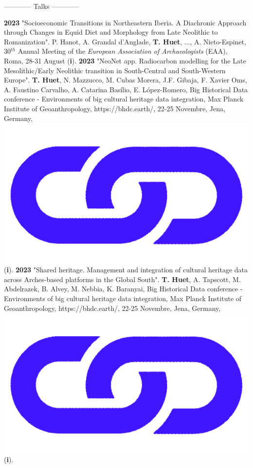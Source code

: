 \documentclass{article}
\newcommand{\fr}[1]{} %
\newcommand{\en}[1]{#1}   %
\begin{document}
\begin{center}
\fr{------------ Communications ------------}
\en{------------ Talks ------------}
\end{center} 
\smallbreak
\textbf{2023 }"Socioeconomic Transitions in Northeastern Iberia. A Diachronic Approach through Changes in Equid Diet and Morphology from Late Neolithic to Romanization". P. Hanot, A. Grandal d'Anglade, \textbf{T. Huet}, ..., A. Nieto-Espinet, 30${}^{th}$ Annual Meeting of the \textit{European Association of Archaeologists} (EAA), Roma, 28-31 August (\textbf{i}).
\smallbreak
\textbf{2023 }"NeoNet app. Radiocarbon modelling for the Late Mesolithic/Early Neolithic transition in South-Central and South-Western Europe". \textbf{T. Huet}, N. Mazzucco, M. Cubas Morera, J.F. Gibaja, F. Xavier Oms, A. Faustino Carvalho, A. Catarina Basílio, E. López-Romero, Big Historical Data conference - Environments of big cultural heritage data integration, Max Planck Institute of Geoanthropology, https://bhdc.earth/, 22-25 Novembre, Jena, Germany,  \href{https://zoometh.github.io/neonet/doc/talks/2023-bhdc}{\includegraphics[scale=0.02]{link_darkblue.png}} (\textbf{i}).
\smallbreak
\textbf{2023 }"Shared heritage. Management and integration of cultural heritage data across Arches-based platforms in the Global South". \textbf{T. Huet}, A. Tapscott, M. Abdelrazek, B. Alvey, M. Nebbia, K. Baranyai, Big Historical Data conference - Environments of big cultural heritage data integration, Max Planck Institute of Geoanthropology, https://bhdc.earth/, 22-25 Novembre, Jena, Germany,  \href{https://colab.research.google.com/github/achp-project/cultural-heritage/blob/main/presentation/bhdc/rm_compar.ipynb}{\includegraphics[scale=0.02]{link_darkblue.png}} (\textbf{i}).
\end{document}
